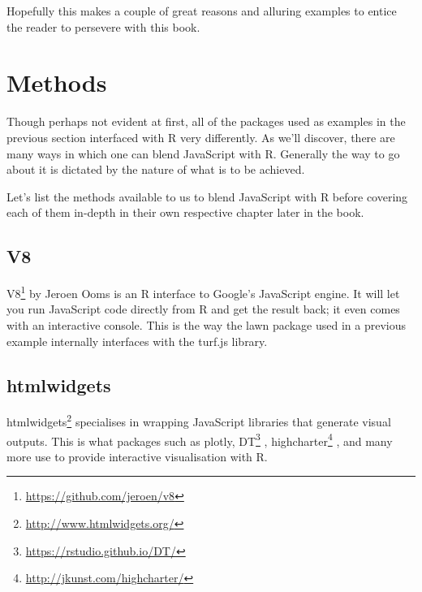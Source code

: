 \documentclass[
]{krantz}
\makeatletter
\newenvironment{Shaded}{\begin{snugshade}}{\end{snugshade}}
\newcommand{\CommentTok}[1]{\textcolor[rgb]{0.37,0.37,0.37}{\textit{#1}}}
\newcommand{\KeywordTok}[1]{\textcolor[rgb]{0.27,0.27,0.27}{\textbf{#1}}}
\newcommand{\NormalTok}[1]{#1}
\newcommand{\OperatorTok}[1]{\textcolor[rgb]{0.43,0.43,0.43}{\textbf{#1}}}
\newcommand{\StringTok}[1]{\textcolor[rgb]{0.5,0.5,0.5}{#1}}
\renewcommand{\href}[2]{#2\footnote{\url{#1}}}
\newenvironment{kframe}{%
\medskip{}
\setlength{\fboxsep}{.8em}
 \def\at@end@of@kframe{}%
 \ifinner\ifhmode%
  \def\at@end@of@kframe{\end{minipage}}%
  \begin{minipage}{\columnwidth}%
 \fi\fi%
 \def\FrameCommand##1{\hskip\@totalleftmargin \hskip-\fboxsep
 \colorbox{shadecolor}{##1}\hskip-\fboxsep
     \hskip-\linewidth \hskip-\@totalleftmargin \hskip\columnwidth}%
 \MakeFramed {\advance\hsize-\width
   \@totalleftmargin\z@ \linewidth\hsize
   \@setminipage}}%
 {\par\unskip\endMakeFramed%
 \at@end@of@kframe}
\renewenvironment{Shaded}{\begin{kframe}}{\end{kframe}}
\makeatother
\begin{document}
Hopefully this makes a couple of great reasons and alluring examples to entice the reader to persevere with this book.

\hypertarget{intro-methods}{%
\section{Methods}\label{intro-methods}}

Though perhaps not evident at first, all of the packages used as examples in the previous section interfaced with R very differently. As we'll discover, there are many ways in which one can blend JavaScript with R. Generally the way to go about it is dictated by the nature of what is to be achieved.

Let's list the methods available to us to blend JavaScript with R before covering each of them in-depth in their own respective chapter later in the book.

\hypertarget{intro-v8}{%
\subsection{V8}\label{intro-v8}}

\href{https://github.com/jeroen/v8}{V8} by Jeroen Ooms is an R interface to Google's JavaScript engine. It will let you run JavaScript code directly from R and get the result back; it even comes with an interactive console. This is the way the lawn package used in a previous example internally interfaces with the turf.js library.

\begin{Shaded}
\end{Shaded}

\hypertarget{intro-htmlwidgets}{%
\subsection{htmlwidgets}\label{intro-htmlwidgets}}

\href{http://www.htmlwidgets.org/}{htmlwidgets} \citep{R-htmlwidgets} specialises in wrapping JavaScript libraries that generate visual outputs. This is what packages such as plotly, \href{https://rstudio.github.io/DT/}{DT} \citep{R-DT}, \href{http://jkunst.com/highcharter/}{highcharter} \citep{R-highcharter}, and many more use to provide interactive visualisation with R.
\end{document}

